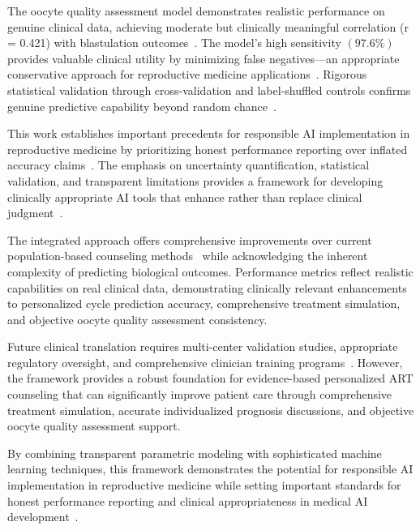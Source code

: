 \documentclass[pdflatex,sn-basic]{sn-jnl}%
\begin{document}
The oocyte quality assessment model demonstrates realistic performance on genuine clinical data, achieving moderate but clinically meaningful correlation (r = 0.421) with blastulation outcomes~\cite{varoquaux2022machine}. The model's high sensitivity $(97.6\%)$ provides valuable clinical utility by minimizing false negatives—an appropriate conservative approach for reproductive medicine applications~\cite{cutting2008elective}. Rigorous statistical validation through cross-validation and label-shuffled controls confirms genuine predictive capability beyond random chance~\cite{cohen1988statistical,mann1947test}.

This work establishes important precedents for responsible AI implementation in reproductive medicine by prioritizing honest performance reporting over inflated accuracy claims~\cite{rudin2019stop,topol2019high}. The emphasis on uncertainty quantification, statistical validation, and transparent limitations provides a framework for developing clinically appropriate AI tools that enhance rather than replace clinical judgment~\cite{rajkomar2019machine}.

The integrated approach offers comprehensive improvements over current population-based counseling methods~\cite{paternot2009observer,paternot2011multicentre} while acknowledging the inherent complexity of predicting biological outcomes. Performance metrics reflect realistic capabilities on real clinical data, demonstrating clinically relevant enhancements to personalized cycle prediction accuracy, comprehensive treatment simulation, and objective oocyte quality assessment consistency.

Future clinical translation requires multi-center validation studies, appropriate regulatory oversight, and comprehensive clinician training programs~\cite{fda2021ai,fda2022clinical,varoquaux2022machine}. However, the framework provides a robust foundation for evidence-based personalized ART counseling that can significantly improve patient care through comprehensive treatment simulation, accurate individualized prognosis discussions, and objective oocyte quality assessment support.

By combining transparent parametric modeling with sophisticated machine learning techniques, this framework demonstrates the potential for responsible AI implementation in reproductive medicine while setting important standards for honest performance reporting and clinical appropriateness in medical AI development~\cite{topol2019high,litjens2017survey}. 



\end{document}
